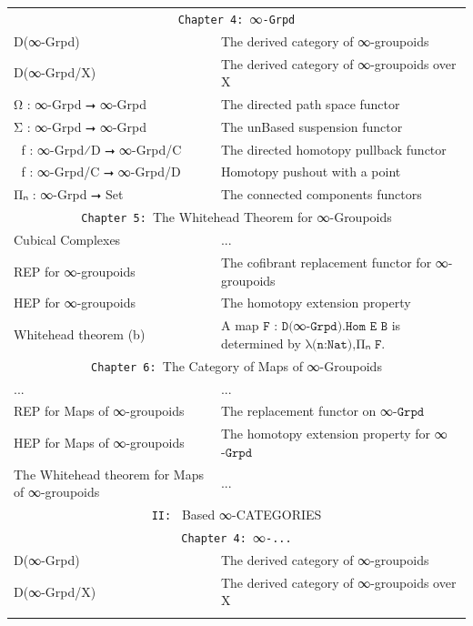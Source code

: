 \documentclass{book}
\theoremstyle{definition}
\begin{document}
{\begin{longtable}{|| l || l ||}
{\hline \hline
\multicolumn{2}{||c||}{\texttt{II: } ∞-Groupoids} \\
\hline \hline 
\multicolumn{2}{||c||}{\texttt{Chapter 4: }∞\texttt{-Grpd}}\\
\hline \hline
D(∞-Grpd) & The derived category of ∞-groupoids \\
\hline
D(∞-Grpd/X) & The derived category of ∞-groupoids over X \\
\hline
Ω⃡ : ∞-Grpd ⭢ ∞-Grpd & The directed path space functor \\
 \hline 
Σ⃡ : ∞-Grpd ⭢ ∞-Grpd & The unBased suspension functor \\
 \hline 
ω⃡ f : ∞-Grpd⁄D ⭢ ∞-Grpd/C & The directed homotopy pullback functor\\
\hline 
σ⃡ f : ∞-Grpd/C ⭢ ∞-Grpd/D & Homotopy pushout with a point \\
 \hline 
Πₙ : ∞-Grpd ⭢ Set & The connected components functors\\
 \hline \hline
 \multicolumn{2}{||c||}{\texttt{Chapter 5: }The Whitehead Theorem for ∞-Groupoids} \\
\hline \hline
Cubical Complexes & ...\\
\hline
REP for ∞-groupoids & The cofibrant replacement functor for ∞-groupoids\\
\hline
HEP for ∞-groupoids & The homotopy extension property\\
\hline
Whitehead theorem (b) & A map $\texttt{F : D(}$∞$\texttt{-Grpd).Hom E B}$ is determined by $\texttt{λ(n:Nat),}$Πₙ
$\texttt{F}$. \\
\hline \hline
\multicolumn{2}{||c||}{\texttt{Chapter 6: }The Category of Maps of ∞-Groupoids} \\
\hline \hline
... & ...\\
\hline
REP for Maps of ∞-groupoids & The replacement functor on ∞$\texttt{-Grpd}$ \\
\hline
HEP for Maps of ∞-groupoids & The homotopy extension property for ∞$\texttt{-Grpd}$\\
 \hline 
The Whitehead theorem for Maps of ∞-groupoids & ... \\
\hline \hline
\multicolumn{2}{||c||}{\texttt{II: } Based ∞-CATEGORIES} \\
\hline \hline 
\multicolumn{2}{||c||}{\texttt{Chapter 4: }∞\texttt{-...}}\\
\hline \hline
D(∞-Grpd) & The derived category of ∞-groupoids \\
\hline
D(∞-Grpd/X) & The derived category of ∞-groupoids over X \\
}
\end{longtable}}
\end{document}
